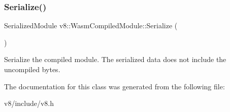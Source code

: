 \subsubsection{\texorpdfstring{Serialize()}{Serialize()}}
{\footnotesize\ttfamily Serialized\+Module v8\+::\+Wasm\+Compiled\+Module\+::\+Serialize (\begin{DoxyParamCaption}{ }\end{DoxyParamCaption})}

Serialize the compiled module. The serialized data does not include the uncompiled bytes. 

The documentation for this class was generated from the following file\+:\begin{DoxyCompactItemize}
\item 
v8/include/v8.\+h\end{DoxyCompactItemize}
